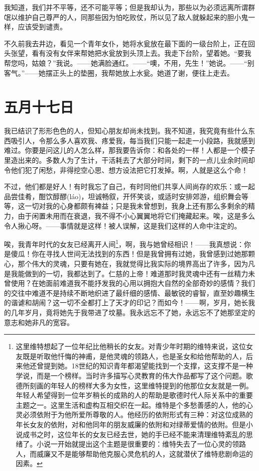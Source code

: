 \documentclass[12pt,oneside]{book}
\begin{document}
我知道，我们并不平等，还不可能平等；但是我却认为，那些以为必须远离所谓群氓以维护自己尊严的人，同那些因为怕吃败仗，所以见了敌人就躲起来的胆小鬼一样，应该受到谴责。

不久前我去井边，看见一个青年女仆，她将水瓮放在最下面的一级台阶上，正在回头张望，看有没有女伴来帮她把水瓮放到头顶上去。我走下台阶，望着她。“要我帮您吗，姑娘？”我说。——她满脸通红。——“噢，不用，先生！”她说。——“别客气。”——她摆正头上的垫圈，我帮她放上水瓮。她道了谢，便往上走去。


\chapter{五月十七日}
\label{sec-2-6}
我已结识了形形色色的人，但知心朋友却尚未找到。我不知道，我究竟有些什么东西吸引人，令那么多人喜欢我、疼爱我，每当我们只能一起走一小段路，我就感到难过。你要是问这儿的人怎么样，那我要告诉你：和各处的一样！人都是一个模子里造出来的。多数人为了生计，干活耗去了大部分时间，剩下的一点儿业余时间却令他们犯了闲愁，非得挖空心思、想方设法把它打发掉。啊，人就是这么个命！

不过，他们都是好人！有时我忘了自己，有时同他们共享人间尚存的欢乐：或一起品尝佳肴，酣饮醇醪(láo)，坦诚畅叙，开怀笑谈，或适时安排郊游，组织舞会等等，这一切对我的心身都颇有裨益；只是我未曾想到，我身上还有那么多剩余的精力，由于闲置未用而在衰退，我不得不小心翼翼地将它们掩藏起来。唉，这是多么令人揪心呀。——事情就是这样！被人误解，这是我们这样的人命中注定的。

唉，我青年时代的女友已经离开人间\footnote{这里维特想起了一位年纪比他稍长的女友。对青少年时期的维特来说，这位女友既是听取他忏悔的神甫，是他灵魂的领路人，也是圣女和给他帮助的人，后来他还曾提到她。18世纪的知识青年都渴望能找到一个支撑，这支撑不是一种学说，而是一个榜样。当时许多描写心灵教育的伟大作品都写了这个问题。歌德所刻画的年轻人的榜样大多为女性，这里维特提到的他那位女友就是一例。年轻人希望得到一位年岁稍长的成熟的人的帮助是歌德时代人际关系中的重要主题之一。这里生活和虚构互相交织在一起。维特是个多愁善感的人，他的心灵必须依附于为他所爱所尊敬的人。他经历的依附形式有三种：对这位成熟的年长女友的依附，对和他同年的朋友威廉的依附和对绿蒂爱情的依附。但是小说成书之时，这位年长的女友已经去世，她的手已经不能来清理维特紊乱的思绪了。小说一开始就提出这个主题是很重要的：维特失去了一位心灵的领路人，而威廉又不是能够帮助他克服心灵危机的人，这就潜伏了维特悲剧命运的因素。}，啊，我与她曾经相识！——我真想说：你是傻瓜！你在寻找人世间无法找到的东西！但是我曾拥有过她，我曾感到过她那颗心，那个伟大的灵魂，只要有她在，我就觉得比我实际的境界高出了许多，因为凡是我能做到的一切，我都达到了。仁慈的上帝！难道那时我灵魂中还有一丝精力未曾使用？在她面前难道我不能抒发我的心用以拥抱大自然的全部奇妙的感情？我们的交往中难道不是持续不断地织进了最纤细的感情、最敏锐的睿智，直至妙趣横生的谐谑和胡闹？这一切不全都打上了天才的印记？而如今！——啊，岁月，她长我的几年岁月，竟将她先于我带进了坟墓。我永远忘不了她，永远忘不了她那坚定的意志和她非凡的宽容。
\end{document}
